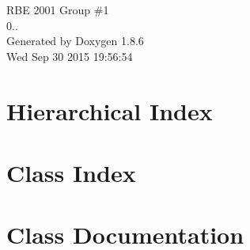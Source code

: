 \documentclass[twoside]{book}
\newcommand{\clearemptydoublepage}{%
  \newpage{\pagestyle{empty}\cleardoublepage}%
}
\begin{document}
\hypersetup{pageanchor=false}
\begin{titlepage}
\vspace*{7cm}
\begin{center}%
{\Large R\-B\-E 2001 Group \#1 \\[1ex]\large 0.. }\\
\vspace*{1cm}
{\large Generated by Doxygen 1.8.6}\\
\vspace*{0.5cm}
{\small Wed Sep 30 2015 19:56:54}\\
\end{center}
\end{titlepage}
\clearemptydoublepage
\tableofcontents
\clearemptydoublepage
{}
\hypersetup{pageanchor=true}

\chapter{Hierarchical Index}

\chapter{Class Index}

\chapter{Class Documentation}






































\newpage
{}
{}
\printindex
\end{document}
